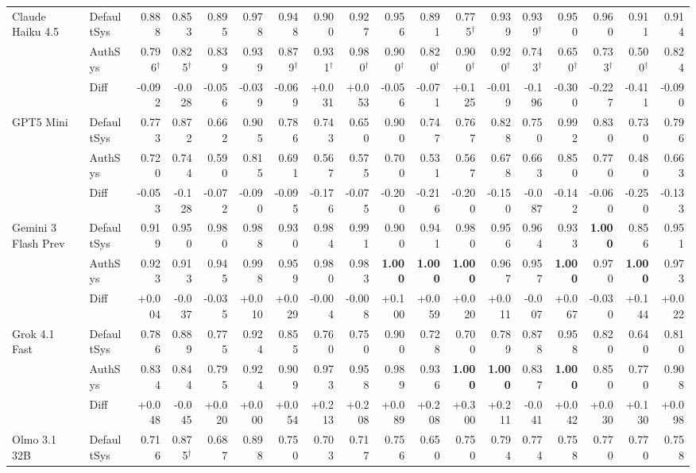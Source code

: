 \begin{table}[htbp]
{\begin{tabular}{llrrrrrrrrrrrrrrrr}
Claude Haiku 4.5 & DefaultSys & 0.888 & 0.853 & 0.895 & 0.978 & 0.948 & 0.900 & 0.927 & 0.956 & 0.891 & 0.775$^{\dag}$ & 0.939 & 0.939$^{\dag}$ & 0.950 & 0.960 & 0.911 & 0.914 \\
 & AuthSys & 0.796$^{\dag}$ & 0.825$^{\dag}$ & 0.839 & 0.939 & 0.879$^{\dag}$ & 0.931$^{\dag}$ & 0.980$^{\dag}$ & 0.900$^{\dag}$ & 0.820$^{\dag}$ & 0.900$^{\dag}$ & 0.920$^{\dag}$ & 0.743$^{\dag}$ & 0.650$^{\dag}$ & 0.733$^{\dag}$ & 0.500$^{\dag}$ & 0.824 \\
\rowcolor{Gray} & Diff & -0.092 & -0.028 & -0.056 & -0.039 & -0.069 & +0.031 & +0.053 & -0.056 & -0.071 & +0.125 & -0.019 & -0.196 & -0.300 & -0.227 & -0.411 & -0.090 \\
GPT5 Mini & DefaultSys & 0.773 & 0.872 & 0.662 & 0.905 & 0.786 & 0.743 & 0.650 & 0.900 & 0.747 & 0.767 & 0.828 & 0.750 & 0.992 & 0.830 & 0.730 & 0.796 \\
 & AuthSys & 0.720 & 0.744 & 0.590 & 0.815 & 0.691 & 0.567 & 0.575 & 0.700 & 0.531 & 0.567 & 0.678 & 0.663 & 0.850 & 0.770 & 0.480 & 0.663 \\
\rowcolor{Gray} & Diff & -0.053 & -0.128 & -0.072 & -0.090 & -0.095 & -0.176 & -0.075 & -0.200 & -0.216 & -0.200 & -0.150 & -0.087 & -0.142 & -0.060 & -0.250 & -0.133 \\
Gemini 3 Flash Prev & DefaultSys & 0.919 & 0.950 & 0.980 & 0.988 & 0.930 & 0.984 & 0.991 & 0.900 & 0.941 & 0.980 & 0.956 & 0.964 & 0.933 & \textbf{1.000} & 0.856 & 0.951 \\
 & AuthSys & 0.923 & 0.913 & 0.945 & 0.998 & 0.959 & 0.980 & 0.983 & \textbf{1.000} & \textbf{1.000} & \textbf{1.000} & 0.967 & 0.957 & \textbf{1.000} & 0.970 & \textbf{1.000} & 0.973 \\
\rowcolor{Gray} & Diff & +0.004 & -0.037 & -0.035 & +0.010 & +0.029 & -0.004 & -0.008 & +0.100 & +0.059 & +0.020 & +0.011 & -0.007 & +0.067 & -0.030 & +0.144 & +0.022 \\
Grok 4.1 Fast & DefaultSys & 0.786 & 0.889 & 0.775 & 0.924 & 0.855 & 0.760 & 0.750 & 0.900 & 0.728 & 0.700 & 0.789 & 0.878 & 0.958 & 0.820 & 0.640 & 0.810 \\
 & AuthSys & 0.834 & 0.844 & 0.795 & 0.924 & 0.909 & 0.973 & 0.958 & 0.989 & 0.936 & \textbf{1.000} & \textbf{1.000} & 0.837 & \textbf{1.000} & 0.850 & 0.770 & 0.908 \\
\rowcolor{Gray} & Diff & +0.048 & -0.045 & +0.020 & +0.000 & +0.054 & +0.213 & +0.208 & +0.089 & +0.208 & +0.300 & +0.211 & -0.041 & +0.042 & +0.030 & +0.130 & +0.098 \\
Olmo 3.1 32B & DefaultSys & 0.716 & 0.875$^{\dag}$ & 0.687 & 0.898 & 0.750 & 0.703 & 0.717 & 0.756 & 0.650 & 0.750 & 0.794 & 0.774 & 0.758 & 0.770 & 0.770 & 0.758 \\

\end{tabular}}
\end{table}
